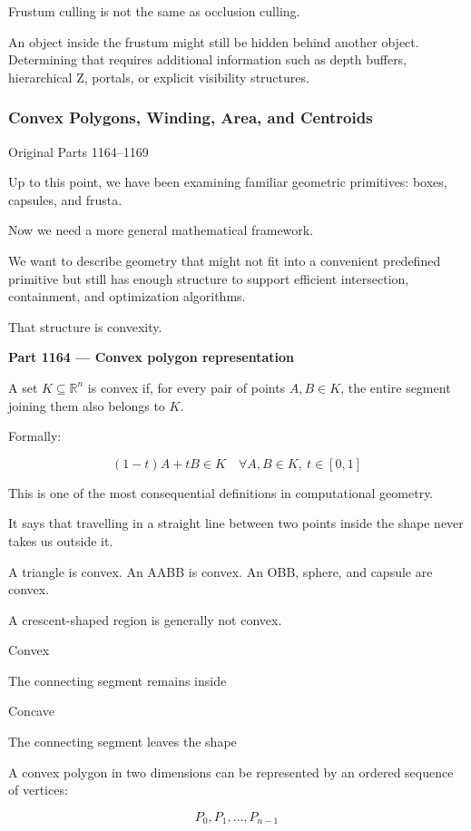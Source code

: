 Frustum culling is not the same as occlusion culling.

An object inside the frustum might still be hidden behind another object. Determining that requires additional information such as depth buffers, hierarchical Z, portals, or explicit visibility structures.

\subsubsection{Convex Polygons, Winding, Area, and Centroids}\label{convex-polygons-winding-area-and-centroids}

Original Parts 1164--1169

Up to this point, we have been examining familiar geometric primitives: boxes, capsules, and frusta.

Now we need a more general mathematical framework.

We want to describe geometry that might not fit into a convenient predefined primitive but still has enough structure to support efficient intersection, containment, and optimization algorithms.

That structure is convexity.

\textbf{Part 1164 --- Convex polygon representation}

A set \(K\subseteq\mathbb R^n\) is convex if, for every pair of points \(A,B\in K\), the entire segment joining them also belongs to \(K\).

Formally:

\[
\boxed{ (1-t)A+tB\in K \quad \forall A,B\in K,\ t\in[0,1] }
\]

This is one of the most consequential definitions in computational geometry.

It says that travelling in a straight line between two points inside the shape never takes us outside it.

A triangle is convex. An AABB is convex. An OBB, sphere, and capsule are convex.

A crescent-shaped region is generally not convex.

Convex

The connecting segment remains inside

Concave

The connecting segment leaves the shape

A convex polygon in two dimensions can be represented by an ordered sequence of vertices:

\[
P_0,P_1,\ldots,P_{n-1}
\]

